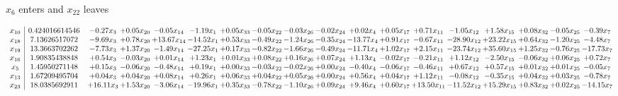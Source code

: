 \documentclass[9pt]{article}
\begin{document}
 $ x_{6} $ enters and $ x_{22} $ leaves 

 \[\begin{array}{c| c c@{\hskip 2pt} c@{\hskip 2pt} c@{\hskip 2pt} c@{\hskip 2pt} c@{\hskip 2pt} c@{\hskip 2pt} c@{\hskip 2pt} c@{\hskip 2pt} c@{\hskip 2pt} c@{\hskip 2pt} c@{\hskip 2pt} c@{\hskip 2pt} c@{\hskip 2pt} c@{\hskip 2pt} c@{\hskip 2pt} c@{\hskip 2pt} }
 x_{10}   &  0.424016614546 & -0.27 x_{3} & +  0.05 x_{20} & -0.05 x_{14} & -1.19 x_{1} & +  0.05 x_{33} & -0.05 x_{22} & -0.03 x_{26} & -0.02 x_{24} & +  0.02 x_{4} & +  0.05 x_{17} & +  0.71 x_{11} & -1.05 x_{12} & +  1.58 x_{15} & +  0.08 x_{32} & -0.05 x_{25} & -0.39 x_{7}\\
 x_{18}   &  7.13626517072 & -9.69 x_{3} & +  0.78 x_{20} & + 13.67 x_{14} & -14.52 x_{1} & +  0.53 x_{33} & -0.49 x_{22} & -1.24 x_{26} & -0.35 x_{24} & -13.77 x_{4} & +  0.91 x_{17} & -0.67 x_{11} & -28.90 x_{12} & + 23.22 x_{15} & +  0.64 x_{32} & -1.20 x_{25} & -4.48 x_{7}\\
 x_{19}   &  13.3663702262 & -7.73 x_{3} & +  1.37 x_{20} & -1.49 x_{14} & -27.25 x_{1} & +  0.17 x_{33} & -0.82 x_{22} & -1.66 x_{26} & -0.49 x_{24} & -11.71 x_{4} & +  1.02 x_{17} & +  2.15 x_{11} & -23.74 x_{12} & + 35.60 x_{15} & +  1.25 x_{32} & -0.76 x_{25} & -17.73 x_{7}\\
 x_{16}   &  1.90835438848 & +  0.54 x_{3} & -0.03 x_{20} & +  0.01 x_{14} & +  1.23 x_{1} & +  0.01 x_{33} & +  0.08 x_{22} & +  0.16 x_{26} & +  0.07 x_{24} & +  1.13 x_{4} & -0.02 x_{17} & -0.21 x_{11} & +  1.12 x_{12} & -2.50 x_{15} & -0.06 x_{32} & +  0.06 x_{25} & +  0.72 x_{7}\\
 x_{5}   &  1.45950271148 & +  0.15 x_{3} & -0.06 x_{20} & -0.48 x_{14} & +  0.19 x_{1} & +  0.00 x_{33} & -0.03 x_{22} & -0.02 x_{26} & +  0.00 x_{24} & -0.40 x_{4} & -0.06 x_{17} & -0.46 x_{11} & +  0.67 x_{12} & +  0.57 x_{15} & +  0.01 x_{32} & +  0.01 x_{25} & -0.05 x_{7}\\
 x_{13}   &  1.67209495704 & +  0.04 x_{3} & +  0.04 x_{20} & +  0.08 x_{14} & +  0.26 x_{1} & +  0.06 x_{33} & +  0.04 x_{22} & +  0.05 x_{26} & +  0.00 x_{24} & +  0.56 x_{4} & +  0.04 x_{17} & +  1.12 x_{11} & -0.08 x_{12} & -0.35 x_{15} & +  0.04 x_{32} & +  0.03 x_{25} & -0.78 x_{7}\\
 x_{23}   &  18.0385692911 & + 16.11 x_{3} & +  1.53 x_{20} & -3.06 x_{14} & -19.96 x_{1} & +  0.35 x_{33} & -0.78 x_{22} & -1.10 x_{26} & +  0.09 x_{24} & +  9.46 x_{4} & +  0.60 x_{17} & + 13.50 x_{11} & -11.52 x_{12} & + 15.29 x_{15} & +  0.83 x_{32} & +  0.02 x_{25} & -14.15 x_{7}\\

\end{array}\]
\end{document}
